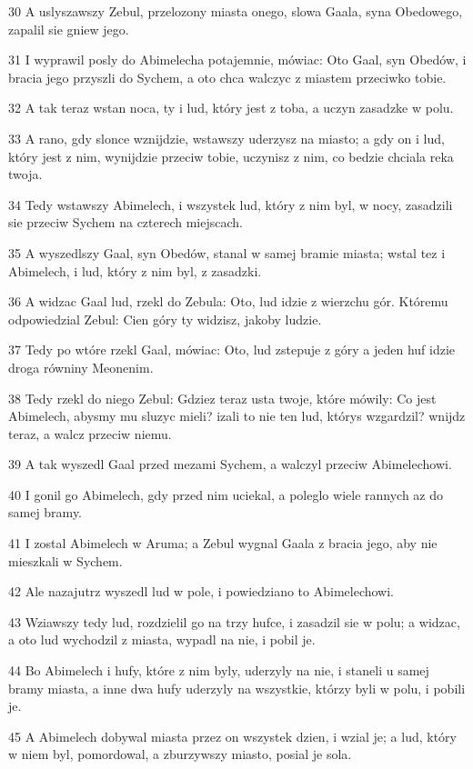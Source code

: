 \par 30 A uslyszawszy Zebul, przelozony miasta onego, slowa Gaala, syna Obedowego, zapalil sie gniew jego.
\par 31 I wyprawil posly do Abimelecha potajemnie, mówiac: Oto Gaal, syn Obedów, i bracia jego przyszli do Sychem, a oto chca walczyc z miastem przeciwko tobie.
\par 32 A tak teraz wstan noca, ty i lud, który jest z toba, a uczyn zasadzke w polu.
\par 33 A rano, gdy slonce wznijdzie, wstawszy uderzysz na miasto; a gdy on i lud, który jest z nim, wynijdzie przeciw tobie, uczynisz z nim, co bedzie chciala reka twoja.
\par 34 Tedy wstawszy Abimelech, i wszystek lud, który z nim byl, w nocy, zasadzili sie przeciw Sychem na czterech miejscach.
\par 35 A wyszedlszy Gaal, syn Obedów, stanal w samej bramie miasta; wstal tez i Abimelech, i lud, który z nim byl, z zasadzki.
\par 36 A widzac Gaal lud, rzekl do Zebula: Oto, lud idzie z wierzchu gór. Któremu odpowiedzial Zebul: Cien góry ty widzisz, jakoby ludzie.
\par 37 Tedy po wtóre rzekl Gaal, mówiac: Oto, lud zstepuje z góry a jeden huf idzie droga równiny Meonenim.
\par 38 Tedy rzekl do niego Zebul: Gdziez teraz usta twoje, które mówily: Co jest Abimelech, abysmy mu sluzyc mieli? izali to nie ten lud, którys wzgardzil? wnijdz teraz, a walcz przeciw niemu.
\par 39 A tak wyszedl Gaal przed mezami Sychem, a walczyl przeciw Abimelechowi.
\par 40 I gonil go Abimelech, gdy przed nim uciekal, a poleglo wiele rannych az do samej bramy.
\par 41 I zostal Abimelech w Aruma; a Zebul wygnal Gaala z bracia jego, aby nie mieszkali w Sychem.
\par 42 Ale nazajutrz wyszedl lud w pole, i powiedziano to Abimelechowi.
\par 43 Wziawszy tedy lud, rozdzielil go na trzy hufce, i zasadzil sie w polu; a widzac, a oto lud wychodzil z miasta, wypadl na nie, i pobil je.
\par 44 Bo Abimelech i hufy, które z nim byly, uderzyly na nie, i staneli u samej bramy miasta, a inne dwa hufy uderzyly na wszystkie, którzy byli w polu, i pobili je.
\par 45 A Abimelech dobywal miasta przez on wszystek dzien, i wzial je; a lud, który w niem byl, pomordowal, a zburzywszy miasto, posial je sola.
